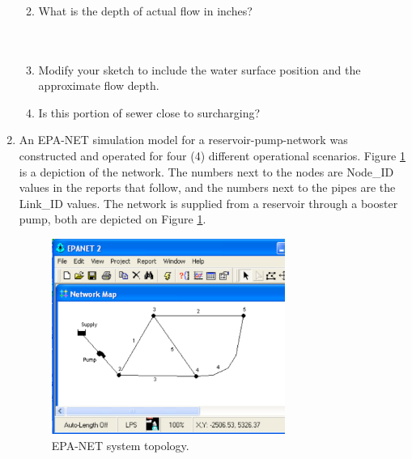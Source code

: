 \documentclass[11pt]{article}
\begin{document}
\begin{enumerate}
\begin{enumerate}
~\\
~\\
~\\
\item What is the depth of actual flow in inches?
~\\
~\\
~\\
\item Modify your sketch to include the water surface position and the approximate flow depth.
~\\
\item Is this portion of sewer close to surcharging?
~\\
\end{enumerate}

\clearpage



\clearpage
\item  An EPA-NET simulation model for a reservoir-pump-network was constructed and operated for four (4) different operational scenarios.   Figure \ref{fig:epa-net-map} is a depiction of the network.   The numbers next to the nodes are Node\_ID values in the reports that follow, and the numbers next to the pipes are the Link\_ID values.  The network is supplied from a reservoir through a booster pump, both are depicted on Figure \ref{fig:epa-net-map}. 

\begin{figure}[h!] %
\centering
   \includegraphics[width=3in]{epa-net-map.pdf}
   \caption{EPA-NET system topology.}
   \label{fig:epa-net-map} 
\end{figure}


\end{enumerate}
\end{document}
